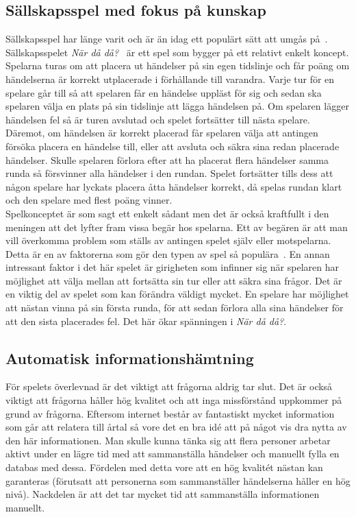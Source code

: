 \documentclass[a4paper, 11pt]{article}
\begin{document}
\subsection{Sällskapsspel med fokus på kunskap} \label{nardada}
Sällskapsspel har länge varit och är än idag ett populärt sätt att umgås på~\cite{bradspelspop}. Sällskapsspelet \textit{När då då?}~\cite{nardada} är ett spel som bygger på ett relativt enkelt koncept. Spelarna turas om att placera ut händelser på sin egen tidslinje och får poäng om händelserna är korrekt utplacerade i förhållande till varandra. Varje tur för en spelare går till så att spelaren får en händelse uppläst för sig och sedan ska spelaren välja en plats på sin tidslinje att lägga händelsen på. Om spelaren lägger händelsen fel så är turen avslutad och spelet fortsätter till nästa spelare. Däremot, om händelsen är korrekt placerad får spelaren välja att antingen försöka placera en händelse till, eller att avsluta och säkra sina redan placerade händelser. Skulle spelaren förlora efter att ha placerat flera händelser samma runda så försvinner alla händelser i den rundan. Spelet fortsätter tills dess att någon spelare har lyckats placera åtta händelser korrekt, då spelas rundan klart och den spelare med flest poäng vinner.\\


Spelkonceptet är som sagt ett enkelt sådant men det är också kraftfullt i den meningen att det lyfter fram vissa begär hos spelarna. Ett av begären är att man vill överkomma problem som ställs av antingen spelet själv eller motspelarna. Detta är en av faktorerna som gör den typen av spel så populära~\cite[sid 3--4]{psykologi}. En annan intressant faktor i det här spelet är girigheten som infinner sig när spelaren har möjlighet att välja mellan att fortsätta sin tur eller att säkra sina frågor. Det är en viktig del av spelet som kan förändra väldigt mycket. En spelare har möjlighet att nästan vinna på sin första runda, för att sedan förlora alla sina händelser för att den sista placerades fel. Det här ökar spänningen i \textit{När då då?}.

\subsection{Automatisk informationshämtning}
För spelets överlevnad är det viktigt att frågorna aldrig tar slut. Det är också viktigt att frågorna håller hög kvalitet och att inga missförstånd uppkommer på grund av frågorna. Eftersom internet består av fantastiskt mycket information som går att relatera till årtal så vore det en bra idé att på något vis dra nytta av den här informationen. Man skulle kunna tänka sig att flera personer arbetar aktivt under en lägre tid med att sammanställa händelser och manuellt fylla en databas med dessa. Fördelen med detta vore att en hög kvalitét nästan kan garanteras (förutsatt att personerna som sammanställer händelserna håller en hög nivå). Nackdelen är att det tar mycket tid att sammanställa informationen manuellt.
\end{document}
